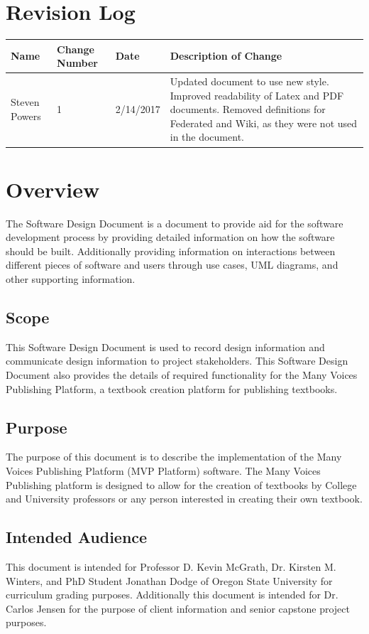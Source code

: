\documentclass[onecolumn, draftclsnofoot,10pt, compsoc]{IEEEtran}
\begin{document}
\section{Revision Log}
\begin{flushleft}
\tablehead{}
\begin{supertabular}{|p{3cm}|p{3cm}|p{3cm}|p{7cm}|}
\hline
Name & Change Number & Date & Description of Change  
\\\hline
Steven Powers & 1 & 2/14/2017 & Updated document to use new style.
								Improved readability of Latex and PDF
								documents. Removed definitions for Federated
								and Wiki, as they were not used in the 
								document.
\\ \hline

\end{supertabular}
\end{flushleft}

\section{Overview}
\noindent The Software Design Document is a document to provide aid
for the software development process by providing detailed information
on how the software should be built. Additionally providing information
on interactions between different pieces of software and users through
use cases, UML diagrams, and other supporting information.

\subsection{Scope}
\noindent This Software Design Document is used to record design
information and communicate design information to project stakeholders.
This Software Design Document also provides the details of required
functionality for the Many Voices Publishing Platform, a textbook creation
platform for publishing textbooks.

\subsection{Purpose}
\noindent The purpose of this document is to describe the implementation
of the Many Voices Publishing Platform (MVP Platform) software.
The Many Voices Publishing platform is designed to allow for the creation
of textbooks by College and University professors or any person interested
in creating their own textbook.

\subsection{Intended Audience}
\noindent This document is intended for Professor D. Kevin McGrath,
Dr. Kirsten M. Winters, and PhD Student Jonathan Dodge of Oregon State
University for curriculum grading purposes.
Additionally this document is intended for Dr. Carlos Jensen for the
purpose of client information and senior capstone project purposes.
\end{document}
